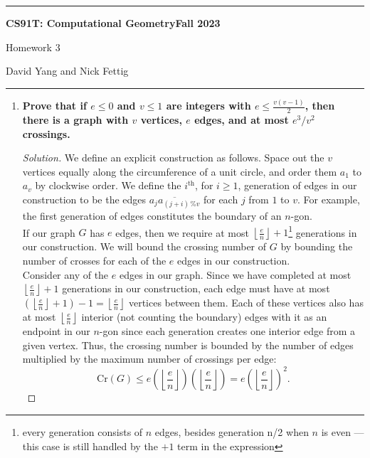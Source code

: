 \documentclass[11pt]{article}
\newenvironment{solution}
  {\renewcommand\qedsymbol{$\blacksquare$}\begin{proof}[Solution]}
  {\end{proof}}
\begin{document}
\hrule
\begin{center}
    \textbf{CS91T: Computational Geometry}\hfill \textbf{Fall 2023}\newline

    {\Large Homework 3}

    David Yang and Nick Fettig
\end{center}

\hrule

\vspace{1em}

\begin{enumerate}
    \item\textbf{Prove that if $e\leq0$ and $v\leq1$ are integers with $e\leq \frac{v(v-1)}{2}$, then there is a graph with $v$ vertices, $e$ edges, and at most $e^3/v^2$ crossings.} 

\begin{solution}
We define an explicit construction as follows. Space out the $v$ vertices equally along the circumference of a unit circle, and order them  $a_1$ to $a_v$ by clockwise order. We define the $i^{\text{th}}$, for $i \geq 1$, generation of edges in our construction to be the edges $\overline{a_{j} a_{(j+i) \, \% v}}$ for each $j$ from $1$ to $v$. For example, the first generation of edges constitutes the boundary of an $n$-gon.\\

If our graph $G$ has $e$ edges, then we require at most  $\left\lfloor\frac{e}{n}\right\rfloor + 1$\footnote{every generation consists of $n$ edges, besides generation n/2 when $n$ is even — this case is still handled by the $+1$ term in the expression} generations in our construction. We will bound the crossing number of $G$ by bounding the number of crosses for each of the $e$ edges in our construction.  \\

Consider any of the $e$ edges in our graph. Since we have completed at most $\left\lfloor\frac{e}{n}\right\rfloor + 1$ generations in our construction, each edge must have at most $\left(\left\lfloor\frac{e}{n}\right\rfloor + 1\right) - 1 = \left\lfloor\frac{e}{n}\right\rfloor$ vertices between them. Each of these vertices also has at most $\left\lfloor\frac{e}{n}\right\rfloor$ interior (not counting the boundary) edges with it as an endpoint in our $n$-gon since each generation creates one interior edge from a given vertex. Thus, the crossing number is bounded by the number of edges multiplied by the maximum number of crossings per edge:
\[ \mathrm{Cr}(G) \leq e\left( \left\lfloor\frac{e}{n}\right\rfloor \right) \left( \left\lfloor\frac{e}{n}\right\rfloor \right) = e \left( \left\lfloor\frac{e}{n}\right\rfloor \right)^2.\]


\end{solution}
\end{enumerate}
\end{document}

